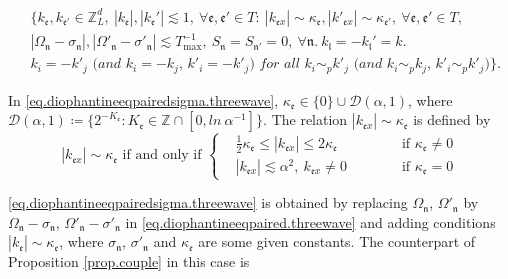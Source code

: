 \begin{equation}\label{eq.diophantineeqpairedsigma.threewave}
\begin{split}
    &\{k_{\mathfrak{e}}, k_{\mathfrak{e}'}\in \mathbb{Z}^d_L,\ |k_{\mathfrak{e}}|, |k_{\mathfrak{e}}'|\lesssim 1,\ \forall \mathfrak{e},\mathfrak{e}'\in T:\  |k_{\mathfrak{e}x}|\sim \kappa_{\mathfrak{e}}, |k'_{\mathfrak{e}x}|\sim \kappa_{\mathfrak{e}'},\ \forall \mathfrak{e},\mathfrak{e}'\in T, 
    \\
    &|\Omega_{\mathfrak{n}}-\sigma_{\mathfrak{n}}|,|\Omega'_{\mathfrak{n}}-\sigma'_{\mathfrak{n}}|\lesssim T^{-1}_{\text{max}},\ S_{\mathfrak{n}}=S_{\mathfrak{n}'}=0,\ \forall \mathfrak{n}.\ k_{\mathfrak{l}}=-k_{\mathfrak{l}}'=k.
    \\
    &\textit{$k_{i}=-k'_{j}$ (and $k_{i}=-k_{j}$, $k'_{i}=-k'_{j}$) for all $k_{i}\sim_{p}k'_{j}$ (and $k_{i}\sim_{p}k_{j}$, $k'_{i}\sim_{p}k'_{j}$)}\}.
\end{split}
\end{equation}

In \eqref{eq.diophantineeqpairedsigma.threewave}, $\kappa_{\mathfrak{e}}\in \{0\}\cup  \mathcal{D}(\alpha,1)$, where $\mathcal{D}(\alpha,1)\coloneqq\{2^{-K_{\mathfrak{e}}}:K_{\mathfrak{e}}\in  \mathbb{Z}\cap [0,ln\ \alpha^{-1}]\}$. The relation $|k_{\mathfrak{e}x}|\sim \kappa_{\mathfrak{e}}$ is defined by 
\begin{equation}\label{eq.kappa.threewave}
    |k_{\mathfrak{e}x}|\sim \kappa_{\mathfrak{e}}\text{ if and only if }\left\{\begin{aligned}
        & \frac{1}{2}\kappa_{\mathfrak{e}}\le  |k_{\mathfrak{e}x}|\le 2\kappa_{\mathfrak{e}} \qquad && \text{ if  $\kappa_{\mathfrak{e}}\ne 0$}
        \\[1em]
        &  |k_{\mathfrak{e}x}|\lesssim \alpha^2,\ k_{\mathfrak{e}x}\ne 0   \qquad && \text{ if  $\kappa_{\mathfrak{e}}= 0$}
    \end{aligned}
    \right.
\end{equation}

\eqref{eq.diophantineeqpairedsigma.threewave} is obtained by replacing $\Omega_{\mathfrak{n}}$, $\Omega'_{\mathfrak{n}}$ by $\Omega_{\mathfrak{n}}-\sigma_{\mathfrak{n}}$, $\Omega'_{\mathfrak{n}}-\sigma'_{\mathfrak{n}}$ in \eqref{eq.diophantineeqpaired.threewave} and adding conditions $|k_{\mathfrak{e}}|\sim \kappa_{\mathfrak{e}}$, where  $\sigma_{\mathfrak{n}}$, $\sigma'_{\mathfrak{n}}$ and $\kappa_{\mathfrak{e}}$ are some given constants. The counterpart of Proposition \ref{prop.couple} in this case is

